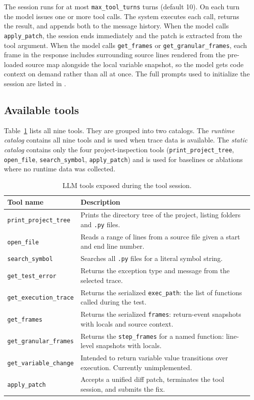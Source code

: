 The session runs for at most \texttt{max\_tool\_turns} turns (default 10). On each turn the model issues one or more tool calls. The system executes each call, returns the result, and appends both to the message history. When the model calls \texttt{apply\_patch}, the session ends immediately and the patch is extracted from the tool argument. When the model calls \texttt{get\_frames} or \texttt{get\_granular\_frames}, each frame in the response includes surrounding source lines rendered from the pre-loaded source map alongside the local variable snapshot, so the model gets code context on demand rather than all at once. The full prompts used to initialize the session are listed in .

\subsection{Available tools}
\label{subsec:tools}

Table~\ref{tab:tools} lists all nine tools. They are grouped into two catalogs. The \emph{runtime catalog} contains all nine tools and is used when trace data is available. The \emph{static catalog} contains only the four project-inspection tools (\texttt{print\_project\_tree}, \texttt{open\_file}, \texttt{search\_symbol}, \texttt{apply\_patch}) and is used for baselines or ablations where no runtime data was collected.

\begin{table}[ht]
\centering
\caption{LLM tools exposed during the tool session.}
\label{tab:tools}
\begin{tabular}{@{}lp{8.2cm}@{}}
\toprule
\textbf{Tool name} & \textbf{Description} \\
\midrule
\texttt{print\_project\_tree}  & Prints the directory tree of the project, listing folders and \texttt{.py} files. \\
\texttt{open\_file}            & Reads a range of lines from a source file given a start and end line number. \\
\texttt{search\_symbol}        & Searches all \texttt{.py} files for a literal symbol string. \\
\texttt{get\_test\_error}      & Returns the exception type and message from the selected trace. \\
\texttt{get\_execution\_trace} & Returns the serialized \texttt{exec\_path}: the list of functions called during the test. \\
\texttt{get\_frames}           & Returns the serialized \texttt{frames}: return-event snapshots with locals and source context. \\
\texttt{get\_granular\_frames} & Returns the \texttt{step\_frames} for a named function: line-level snapshots with locals. \\
\texttt{get\_variable\_change} & Intended to return variable value transitions over execution. Currently unimplemented. \\
\texttt{apply\_patch}          & Accepts a unified diff patch, terminates the tool session, and submits the fix. \\
\bottomrule
\end{tabular}
\end{table}

